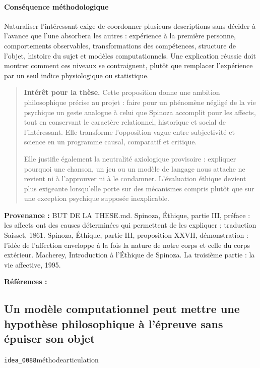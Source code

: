 \documentclass[10pt,a4paper]{article}
\begin{document}
\paragraph{Conséquence méthodologique}
Naturaliser l'intéressant exige de coordonner plusieurs descriptions sans décider à l'avance que l'une absorbera les autres : expérience à la première personne, comportements observables, transformations des compétences, structure de l'objet, histoire du sujet et modèles computationnels. Une explication réussie doit montrer comment ces niveaux se contraignent, plutôt que remplacer l'expérience par un seul indice physiologique ou statistique.

\begin{quote}
\textbf{Intérêt pour la thèse.} Cette proposition donne une ambition philosophique précise au projet : faire pour un phénomène négligé de la vie psychique un geste analogue à celui que Spinoza accomplit pour les affects, tout en conservant le caractère relationnel, historique et social de l'intéressant. Elle transforme l'opposition vague entre subjectivité et science en un programme causal, comparatif et critique.

Elle justifie également la neutralité axiologique provisoire : expliquer pourquoi une chanson, un jeu ou un modèle de langage nous attache ne revient ni à l'approuver ni à le condamner. L'évaluation éthique devient plus exigeante lorsqu'elle porte sur des mécanismes compris plutôt que sur une exception psychique supposée inexplicable.
\end{quote}
{\footnotesize\color{metadata}\textbf{Provenance :} BUT DE LA THESE.md. Spinoza, Éthique, partie III, préface : les affects ont des causes déterminées qui permettent de les expliquer ; traduction Saisset, 1861. Spinoza, Éthique, partie III, proposition XXVII, démonstration : l'idée de l'affection enveloppe à la fois la nature de notre corps et celle du corps extérieur. Macherey, Introduction à l'Éthique de Spinoza. La troisième partie : la vie affective, 1995.\par}
{\footnotesize\color{metadata}\textbf{Références :} \parencite{spinoza1966ethique,spinoza1861oeuvres,macherey1995vieaffective}\par}

\subsection{Un modèle computationnel peut mettre une hypothèse philosophique à l'épreuve sans épuiser son objet}
{\small\color{metadata} \texttt{idea\_0088}\quad\textbullet\quad méthode\quad\textbullet\quad articulation\par}
\end{document}
